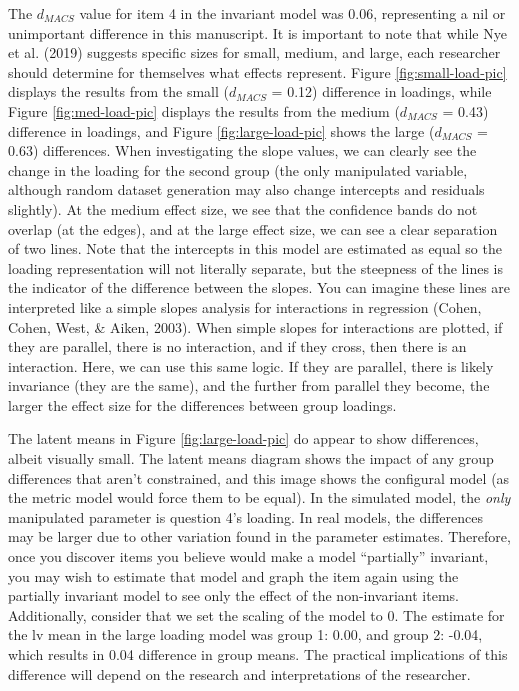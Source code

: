 \documentclass[
  man]{apa6}
\begin{document}
The \(d_{MACS}\) value for item 4 in the invariant model was 0.06, representing a nil or unimportant difference in this manuscript. It is important to note that while Nye et al. (2019) suggests specific sizes for small, medium, and large, each researcher should determine for themselves what effects represent. Figure \ref{fig:small-load-pic} displays the results from the small (\(d_{MACS}\) = 0.12) difference in loadings, while Figure \ref{fig:med-load-pic} displays the results from the medium (\(d_{MACS}\) = 0.43) difference in loadings, and Figure \ref{fig:large-load-pic} shows the large (\(d_{MACS}\) = 0.63) differences. When investigating the slope values, we can clearly see the change in the loading for the second group (the only manipulated variable, although random dataset generation may also change intercepts and residuals slightly). At the medium effect size, we see that the confidence bands do not overlap (at the edges), and at the large effect size, we can see a clear separation of two lines. Note that the intercepts in this model are estimated as equal so the loading representation will not literally separate, but the steepness of the lines is the indicator of the difference between the slopes. You can imagine these lines are interpreted like a simple slopes analysis for interactions in regression (Cohen, Cohen, West, \& Aiken, 2003). When simple slopes for interactions are plotted, if they are parallel, there is no interaction, and if they cross, then there is an interaction. Here, we can use this same logic. If they are parallel, there is likely invariance (they are the same), and the further from parallel they become, the larger the effect size for the differences between group loadings.

The latent means in Figure \ref{fig:large-load-pic} do appear to show differences, albeit visually small. The latent means diagram shows the impact of any group differences that aren't constrained, and this image shows the configural model (as the metric model would force them to be equal). In the simulated model, the \emph{only} manipulated parameter is question 4's loading. In real models, the differences may be larger due to other variation found in the parameter estimates. Therefore, once you discover items you believe would make a model ``partially'' invariant, you may wish to estimate that model and graph the item again using the partially invariant model to see only the effect of the non-invariant items. Additionally, consider that we set the scaling of the model to 0. The estimate for the lv mean in the large loading model was group 1: 0.00, and group 2: -0.04, which results in 0.04 difference in group means. The practical implications of this difference will depend on the research and interpretations of the researcher.
\end{document}
